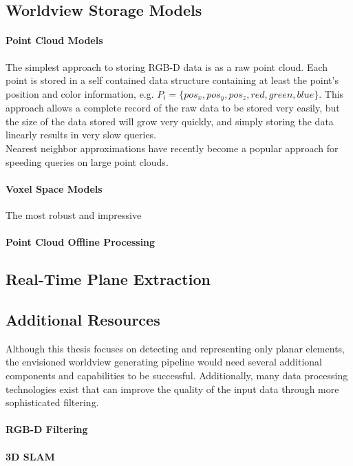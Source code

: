 \subsection{Worldview Storage Models}
\paragraph{Point Cloud Models}
The simplest approach to storing RGB-D data is as a raw point cloud. Each point is stored in a self contained data structure containing at least the point's position and color information, e.g. $P_i=\{pos_x,pos_y,pos_z,red,green,blue\}$. This approach allows a complete record of the raw data to be stored very easily, but the size of the data stored will grow very quickly, and simply storing the data linearly results in very slow queries.\\
Nearest neighbor approximations have recently become a popular approach for speeding queries on large point clouds\cite{muja2009fast}.


\paragraph{Voxel Space Models}
The most robust and impressive 
\paragraph{Point Cloud Offline Processing}
\subsection{Real-Time Plane Extraction}

\subsection{Additional Resources}
Although this thesis focuses on detecting and representing only planar elements, the envisioned worldview generating pipeline would need several additional components and capabilities to be successful. Additionally, many data processing technologies exist that can improve the quality of the input data through more sophisticated filtering.
\paragraph{RGB-D Filtering}
\paragraph{3D SLAM}
